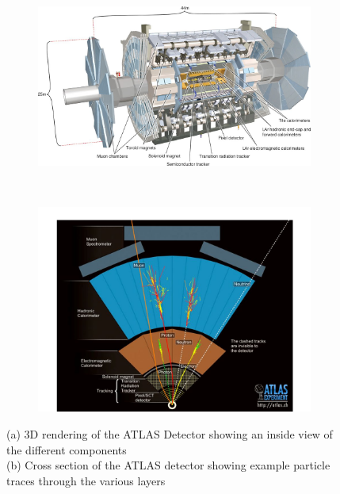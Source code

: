 \begin{figure}[H]
    \centering
    \begin{subfigure}[b]{0.48\textwidth}
        \centering
        \includegraphics[width=\textwidth]{Pictures/ATLASopen.jpg}
    \caption{}
    \end{subfigure}
    ~
    \begin{subfigure}[b]{0.48\textwidth}
        \centering
        \includegraphics[width=\textwidth]{Pictures/ATLAS-X-sec.png}
    \caption{}    
        \end{subfigure}
\caption{(a) 3D rendering of the ATLAS Detector showing an inside view of the different components \\ (b) Cross section of the ATLAS detector showing example particle traces through the various layers \cite{virdee2012physics}}
\label{fig:ATLAScrossSection}
\end{figure}


